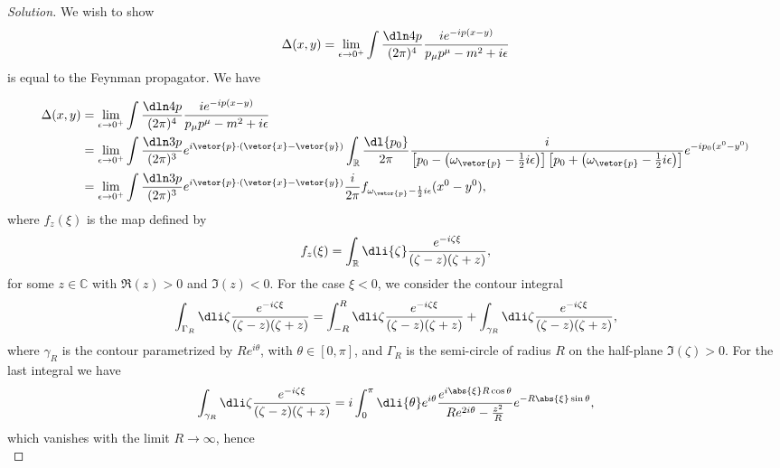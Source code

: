 \begin{proof}[Solution]
   We wish to show
   \begin{equation*}
       \Delta(x,y) = \lim_{\epsilon \to 0^+}{\int \frac{\dln4p}{(2\pi)^4} \frac{i e^{-ip(x - y)}}{p_\mu p^\mu - m^2 + i \epsilon}}
   \end{equation*}
   is equal to the Feynman propagator. We have

   \begin{align*}
      \Delta(x,y)&=\lim_{\epsilon \to 0^+}{\int \frac{\dln4p}{(2\pi)^4} \frac{i e^{-ip(x - y)}}{p_\mu p^\mu - m^2 + i \epsilon}}\\
      &= \lim_{\epsilon \to 0^+}{\int \frac{\dln3p}{(2\pi)^3} e^{i \vetor{p} \cdot (\vetor{x} - \vetor{y})}\int_{\mathbb{R}} \frac{\dl{p_0}}{2\pi} \frac{i}{\left[p_0 - \left(\omega_{\vetor{p}} - \frac12 i\epsilon\right)\right]\left[p_0 + \left(\omega_{\vetor{p}} - \frac12i \epsilon\right)\right]}}e^{-ip_0 (x^0 - y^0)}\\
      &= \lim_{\epsilon \to 0^+}{\int \frac{\dln3p}{(2\pi)^3} e^{i \vetor{p} \cdot (\vetor{x} - \vetor{y})} \frac{i}{2\pi}f_{\omega_{\vetor{p}} - \frac12 i \epsilon}(x^0 - y^0)},
   \end{align*}
   where \(f_{z}(\xi)\) is the map defined by
   \begin{equation*}
      f_{z}(\xi) = \int_{\mathbb{R}} \dli{\zeta} \frac{e^{-i \zeta \xi}}{(\zeta - z)(\zeta + z)},
   \end{equation*}
   for some \(z \in \mathbb{C}\) with \(\Re(z) > 0\) and \(\Im(z) < 0\). For the case \(\xi < 0\), we consider the contour integral
   \begin{equation*}
      \int_{\Gamma_R} \dli\zeta \frac{e^{-i \zeta \xi}}{(\zeta - z)(\zeta + z)} = \int_{-R}^{R} \dli \zeta \frac{e^{-i \zeta \xi}}{(\zeta - z)(\zeta + z)} + \int_{\gamma_R} \dli\zeta \frac{e^{-i \zeta \xi}}{(\zeta - z)(\zeta + z)},
   \end{equation*}
   where \(\gamma_R\) is the contour parametrized by \(Re^{i \theta}\), with \(\theta \in [0, \pi]\), and \(\Gamma_R\) is the semi-circle of radius \(R\) on the half-plane \(\Im(\zeta) > 0\). For the last integral we have
   \begin{equation*}
      \int_{\gamma_R} \dli\zeta \frac{e^{-i \zeta \xi}}{(\zeta - z)(\zeta + z)} = i \int_0^{\pi} \dli{\theta} e^{i\theta} \frac{e^{i\abs{\xi} R \cos\theta}}{R e^{2i\theta} - \frac{z^2}{R}} e^{-R \abs{\xi}\sin\theta},
   \end{equation*}
   which vanishes with the limit \(R \to \infty\), hence
   \begin{equation*}

\end{equation*}
\end{proof}
